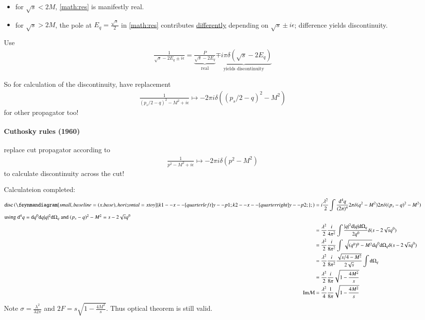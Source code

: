 \begin{itemize}
	\item for $\sqrt{s} < 2M$, \ref{math:res} is manifestly real.
	\item for $\sqrt{s} > 2M$, the pole at $E_q = \frac{\sqrt{s}}{2}$ in \ref{math:res} contributes \underline{differently} depending on $\sqrt{s}\pm i\epsilon$; difference yields discontinuity.
\end{itemize}
Use
\begin{align*}
	\frac{1}{\sqrt{s}-2E_q\pm i\epsilon} = \underbrace{\frac{P}{\sqrt{s} - 2 E_q}}_{\text{real}} \underbrace{\mp i\pi \delta(\sqrt{s} - 2 E_q)}_{\text{yields discontinuity}}
\end{align*}

So for calculation of the discontinuity, have replacement 
\begin{align*}
	\frac{1}{(p_s/2 - q)^2 - M^2 + i\epsilon} \longmapsto -2\pi i \delta((p_s/2 -q)^2 - M^2)
\end{align*}
for other propagator too!

\paragraph{Cuthosky rules (1960)} replace cut propagator according to 
\begin{align}
	\frac{1}{p^2 - M^2 + i\epsilon} \longmapsto -2\pi  i \delta(p^2 - M^2)
\end{align}
to calculate discontinuity across the cut!

Calculateion completed:
\begin{align*}
	\text{disc} \left(	
		\feynmandiagram[small, baseline=(x.base), horizontal=x to y]{
			k1 -- x --[quarter left] y -- p1;
			k2 -- x --[quarter right] y -- p2;
		};
	\right )
	 &= i\frac{\lambda^2}{2} \int \frac{\dd^4 q}{(2\pi)^4} 2\pi \delta(q^2 - M^2) 2\pi \delta((p_s - q)^2 - M^2) \\
	 \shortintertext{using $\dd^4 q = \dd q^0 \dd q |q|^2 \dd \Omega_q$ and $(p_s - q)^2 - M^2 = s - 2\sqrt{s}q^0$}
	 &= \frac{\lambda^2}{2} \frac{i}{4\pi^2} \int \frac{|q|^2 \dd |q| \dd \Omega_q}{2q^0} \delta(s - 2\sqrt{s}q^0) \\
	 &= \frac{\lambda^2}{2} \frac{i}{8\pi^2} \int \sqrt{(q^0)^0 - M^2} \dd q^0 \dd \Omega_q \delta(s - 2\sqrt{s}q^0) \\
	 &= \frac{\lambda^2}{2} \frac{i}{8\pi^2} \frac{\sqrt{s/4 - M^2}}{2\sqrt{s}} \int \dd \Omega_q \\
	 &= \frac{\lambda^2}{2} \frac{i}{8\pi} \sqrt{1 - \frac{4M^2}{s}} \\
	\text{Im}\M &= \frac{\lambda^2}{4} \frac{1}{8\pi} \sqrt{1 - \frac{4M^2}{s}}
\end{align*}
Note $\sigma = \frac{\lambda^2}{32\pi}$ and $2F = s \sqrt{1-\frac{4M^2}{s}}$. Thus optical theorem is still valid.

